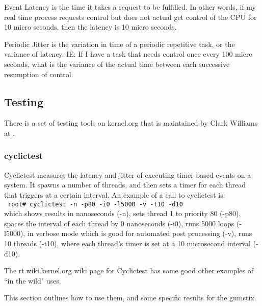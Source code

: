 \documentclass{article}
\newcommand{\rootCom}[1]{\\\indent\indent\texttt{ \small root\# #1}\\}
\begin{document}
Event Latency is the time it takes a request to be fulfilled.  In other words, if my real time process requests control but does not actual get control of the CPU for 10 micro seconds, then the latency is 10 micro seconds.

Periodic Jitter is the variation in time of a periodic repetitive task, or the variance of latency.  IE: If I have a task that needs control once every 100 micro seconds, what is the variance of the actual time between each successive resumption of control.

\subsection{Testing}
There is a set of testing tools on kernel.org that is maintained by Clark Williams at \cite{RTTest}.

\subsubsection{cyclictest}
Cyclictest measures the latency and jitter of executing timer based events on a system.  It spawns a number of threads, and then sets a timer for each thread that triggers at a certain interval.  An example of a call to cyclictest is: \rootCom{cyclictest -n -p80 -i0 -l5000 -v -t10 -d10}which shows results in nanoseconds (-n), sets thread 1 to priority 80 (-p80), spaces the interval of each thread by 0 nanoseconds (-i0), runs 5000 loops (-l5000), in verbose mode which is good for automated post processing (-v), runs 10 threads (-t10), where each thread's timer is set at a 10 microsecond interval (-d10).

The rt.wiki.kernel.org wiki page for Cyclictest has some good other examples of ``in the wild" uses. \cite{rtWikiCyclicTest}

This section outlines how to use them, and some specific results for the gumstix.
\end{document}
